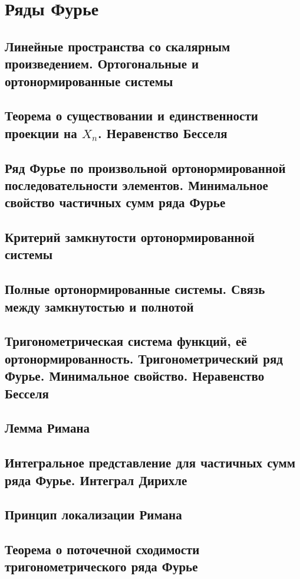 \section{Ряды Фурье}
\subsection{Линейные пространства со скалярным произведением. Ортогональные и ортонормированные системы}
\subsection{Теорема о существовании и единственности проекции на $X_n$. Неравенство Бесселя}

\subsection{Ряд Фурье по произвольной ортонормированной последовательности элементов. Минимальное свойство частичных сумм ряда Фурье}
\subsection{Критерий замкнутости ортонормированной системы}
\subsection{Полные ортонормированные системы. Связь между замкнутостью и полнотой}
\subsection{Тригонометрическая система функций, её ортонормированность. Тригонометрический ряд Фурье. Минимальное свойство. Неравенство Бесселя}
\subsection{Лемма Римана}

\subsection{Интегральное представление для частичных сумм ряда Фурье. Интеграл Дирихле}

\subsection{Принцип локализации Римана}
\subsection{Теорема о поточечной сходимости тригонометрического ряда Фурье}
